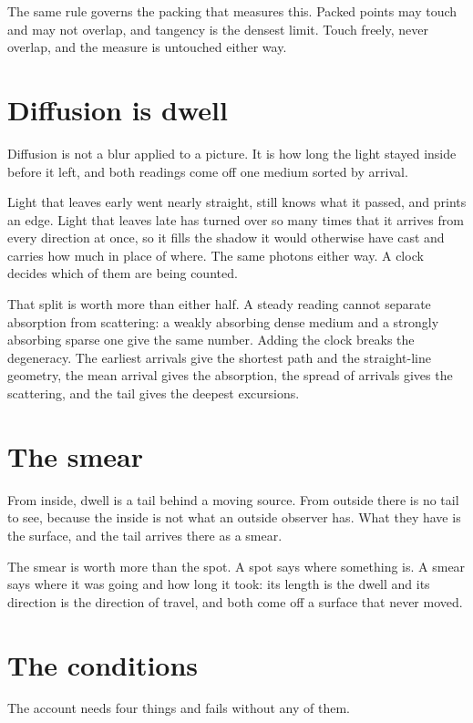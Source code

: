 The same rule governs the packing that measures this. Packed points may touch and may not overlap, and tangency is the densest limit. Touch freely, never overlap, and the measure is untouched either way.

\section{Diffusion is dwell}

Diffusion is not a blur applied to a picture. It is how long the light stayed inside before it left, and both readings come off one medium sorted by arrival.

Light that leaves early went nearly straight, still knows what it passed, and prints an edge. Light that leaves late has turned over so many times that it arrives from every direction at once, so it fills the shadow it would otherwise have cast and carries how much in place of where. The same photons either way. A clock decides which of them are being counted.

That split is worth more than either half. A steady reading cannot separate absorption from scattering: a weakly absorbing dense medium and a strongly absorbing sparse one give the same number. Adding the clock breaks the degeneracy. The earliest arrivals give the shortest path and the straight-line geometry, the mean arrival gives the absorption, the spread of arrivals gives the scattering, and the tail gives the deepest excursions.

\section{The smear}

From inside, dwell is a tail behind a moving source. From outside there is no tail to see, because the inside is not what an outside observer has. What they have is the surface, and the tail arrives there as a smear.

The smear is worth more than the spot. A spot says where something is. A smear says where it was going and how long it took: its length is the dwell and its direction is the direction of travel, and both come off a surface that never moved.

\section{The conditions}

The account needs four things and fails without any of them.

